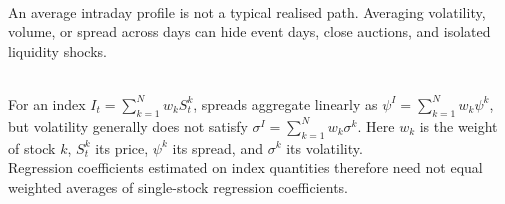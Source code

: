 \begin{caveat} \\
An average intraday profile is not a typical realised path. Averaging volatility, volume, or spread across days can hide event days, close auctions, and isolated liquidity shocks.
\end{caveat}

\begin{model} \\
For an index $I_t=\sum_{k=1}^{N}w_kS_t^k$, spreads aggregate linearly as $\psi^I=\sum_{k=1}^{N}w_k\psi^k$, but volatility generally does not satisfy $\sigma^I=\sum_{k=1}^{N}w_k\sigma^k$. Here $w_k$ is the weight of stock $k$, $S_t^k$ its price, $\psi^k$ its spread, and $\sigma^k$ its volatility.\\
Regression coefficients estimated on index quantities therefore need not equal weighted averages of single-stock regression coefficients.
\end{model}

